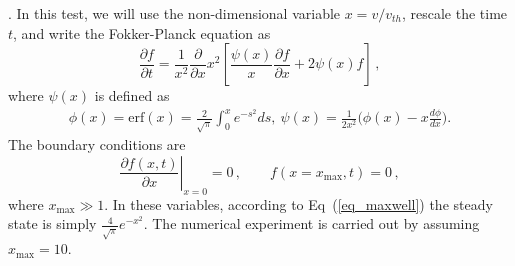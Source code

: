 \documentclass[preprint,11pt]{elsarticle}
\newcommand{\bq}{\begin{equation}}
\newcommand{\eq}{\end{equation}}
\begin{document}
\vspace{10pt}
. In this test, we will use the non-dimensional variable $x=v/v_{th}$, rescale the time $t$, and write the Fokker-Planck equation as
\bq
\frac{\partial f}{\partial t}=\frac{1}{x^2} \frac{\partial}{\partial x} x^2 \left[ \frac{\psi(x)}{x}\frac{\partial f}{\partial x} + 2 \psi(x) f\right] \, ,
\eq
where $\psi(x)$ is defined as
\begin{eqnarray}
\phi(x)=\mathrm{erf}(x)=\frac{2}{\sqrt{\pi}}\int_0^x e^{-s^2}ds,\ \psi(x)=\frac{1}{2x^2}\bigg(\phi(x)-x\frac{d\phi}{dx}\bigg).
\end{eqnarray}
The boundary conditions are
\bq
\left. \frac{\partial f (x,t)}{\partial x}\right|_{x=0}=0 \, , \qquad f(x=x_{\max},t)=0 \, ,
\eq
where $x_{\max} \gg 1$. In these variables, according to Eq~(\ref{eq_maxwell}) the steady state is simply $\frac{4}{\sqrt{\pi}}e^{-x^2}$.%
The numerical experiment is carried out by assuming $x_{\max}=10.$
\end{document}
